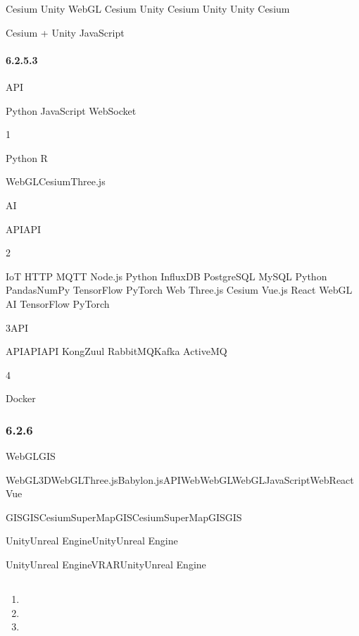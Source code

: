 Cesium Unity WebGL Cesium Unity Cesium Unity Unity Cesium

Cesium + Unity JavaScript

\hypertarget{section-55}{%
\paragraph{6.2.5.3}\label{section-55}}

API

Python JavaScript WebSocket

1

Python R

WebGLCesiumThree.js

AI

APIAPI

2

IoT HTTP MQTT Node.js Python InfluxDB PostgreSQL MySQL Python
PandasNumPy TensorFlow PyTorch Web Three.js Cesium Vue.js React WebGL AI
TensorFlow PyTorch

3API

APIAPIAPI KongZuul RabbitMQKafka ActiveMQ

4

Docker

\hypertarget{section-56}{%
\subsubsection{6.2.6}\label{section-56}}

WebGLGIS

WebGL3DWebGLThree.jsBabylon.jsAPIWebWebGLWebGLJavaScriptWebReactVue

GISGISCesiumSuperMapGISCesiumSuperMapGISGIS

UnityUnreal EngineUnityUnreal Engine

UnityUnreal EngineVRARUnityUnreal Engine

\hypertarget{section-57}{%
\subsection{}\label{section-57}}

\hypertarget{section-58}{%
\subsubsection{}\label{section-58}}

\begin{enumerate}
\def\labelenumi{\arabic{enumi}.}
\tightlist
\item
\item
\item
\end{enumerate}

